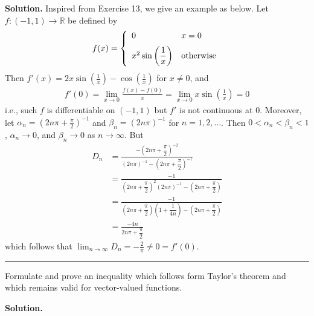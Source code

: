 \documentclass[12pt]{article}
\theoremstyle{definition}
\begin{document}
\smallskip
\noindent\textbf{Solution.}\quad
Inspired from Exercise 13, we give an example as below. Let $f:(-1,1)\to \mathbb{R}$ be defined by
\begin{align*}
f(x)=\left\{\begin{array}{ll}
0&x=0 \vspace{0.08in}\\
x^2\sin\left(\dfrac{1}{x}\right)&\mbox{otherwise}
\end{array}\right.
\end{align*}
Then $f'(x)=2x\sin\left(\frac{1}{x}\right)-\cos\left(\frac{1}{x}\right)$ for $x\ne0$, and
\begin{align*}
f'(0)
=\lim_{x\to 0}\frac{f(x)-f(0)}{x}
=\lim_{x\to 0}x\sin\left(\frac{1}{x}\right)
=0
\end{align*}
i.e., such $f$ is differentiable on $(-1,1)$ but $f'$ is not continuous at $0$. Moreover, let $\alpha_n=\left(2n\pi+\frac{\pi}{2}\right)^{-1}$ and $\beta_n=\left(2n\pi\right)^{-1}$ for $n=1,2,\ldots$. Then $0<\alpha_n<\beta_n<1$, $\alpha_n\to 0$, and $\beta_n\to 0$ as $n\to\infty$. But
\begin{align*}
D_n
&=\frac{-\left(2n\pi+\dfrac{\pi}{2}\right)^{-2}}{\left(2n\pi\right)^{-1}-\left(2n\pi+\dfrac{\pi}{2}\right)^{-1}} \\
&=\frac{-1}{\left(2n\pi+\dfrac{\pi}{2}\right)^{2}\left(2n\pi\right)^{-1}-\left(2n\pi+\dfrac{\pi}{2}\right)} \\
&=\frac{-1}{\left(2n\pi+\dfrac{\pi}{2}\right)\left(1+\dfrac{1}{4n}\right)-\left(2n\pi+\dfrac{\pi}{2}\right)} \\
&=\frac{-4n}{2n\pi+\dfrac{\pi}{2}}
\end{align*}
which follows that $\lim_{n\to\infty}D_n=-\frac{2}{\pi}\ne 0=f'(0)$.



\bigskip\noindent\hrule\bigskip

Formulate and prove an inequality which follows form Taylor's theorem and which remains valid for vector-valued functions.

\smallskip
\noindent\textbf{Solution.}\quad
\end{document}
